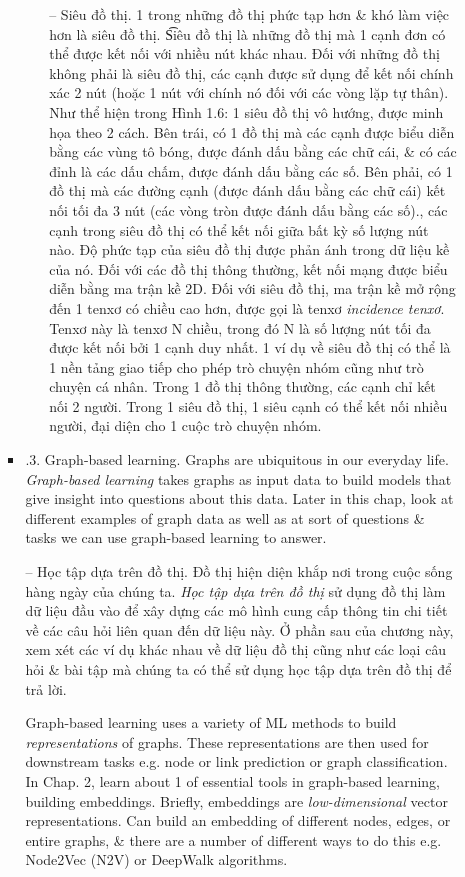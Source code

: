 \documentclass{article}
\begin{document}
\begin{itemize}
\begin{itemize}
\begin{itemize}
\begin{itemize}
                -- {\sf Siêu đồ thị.} 1 trong những đồ thị phức tạp hơn \& khó làm việc hơn là siêu đồ thị. {\t Siêu đồ thị} là những đồ thị mà 1 cạnh đơn có thể được kết nối với nhiều nút khác nhau. Đối với những đồ thị không phải là siêu đồ thị, các cạnh được sử dụng để kết nối chính xác 2 nút (hoặc 1 nút với chính nó đối với các vòng lặp tự thân). Như thể hiện trong {\sf Hình 1.6: 1 siêu đồ thị vô hướng, được minh họa theo 2 cách. Bên trái, có 1 đồ thị mà các cạnh được biểu diễn bằng các vùng tô bóng, được đánh dấu bằng các chữ cái, \& có các đỉnh là các dấu chấm, được đánh dấu bằng các số. Bên phải, có 1 đồ thị mà các đường cạnh (được đánh dấu bằng các chữ cái) kết nối tối đa 3 nút (các vòng tròn được đánh dấu bằng các số).}, các cạnh trong siêu đồ thị có thể kết nối giữa bất kỳ số lượng nút nào. Độ phức tạp của siêu đồ thị được phản ánh trong dữ liệu kề của nó. Đối với các đồ thị thông thường, kết nối mạng được biểu diễn bằng ma trận kề 2D. Đối với siêu đồ thị, ma trận kề mở rộng đến 1 tenxơ có chiều cao hơn, được gọi là tenxơ {\it incidence tenxơ}. Tenxơ này là tenxơ N chiều, trong đó N là số lượng nút tối đa được kết nối bởi 1 cạnh duy nhất. 1 ví dụ về siêu đồ thị có thể là 1 nền tảng giao tiếp cho phép trò chuyện nhóm cũng như trò chuyện cá nhân. Trong 1 đồ thị thông thường, các cạnh chỉ kết nối 2 người. Trong 1 siêu đồ thị, 1 siêu cạnh có thể kết nối nhiều người, đại diện cho 1 cuộc trò chuyện nhóm.
            \end{itemize}
            \item {.3. Graph-based learning.} Graphs are ubiquitous in our everyday life. {\it Graph-based learning} takes graphs as input data to build models that give insight into questions about this data. Later in this chap, look at different examples of graph data as well as at sort of questions \& tasks we can use graph-based learning to answer.

            -- {\sf Học tập dựa trên đồ thị.} Đồ thị hiện diện khắp nơi trong cuộc sống hàng ngày của chúng ta. {\it Học tập dựa trên đồ thị} sử dụng đồ thị làm dữ liệu đầu vào để xây dựng các mô hình cung cấp thông tin chi tiết về các câu hỏi liên quan đến dữ liệu này. Ở phần sau của chương này, xem xét các ví dụ khác nhau về dữ liệu đồ thị cũng như các loại câu hỏi \& bài tập mà chúng ta có thể sử dụng học tập dựa trên đồ thị để trả lời.

            Graph-based learning uses a variety of ML methods to build {\it representations} of graphs. These representations are then used for downstream tasks e.g. node or link prediction or graph classification. In Chap. 2, learn about 1 of essential tools in graph-based learning, building embeddings. Briefly, embeddings are {\it low-dimensional} vector representations. Can build an embedding of different nodes, edges, or entire graphs, \& there are a number of different ways to do this e.g. Node2Vec (N2V) or DeepWalk algorithms.


\end{itemize}
\end{itemize}
\end{itemize}
\end{document}
